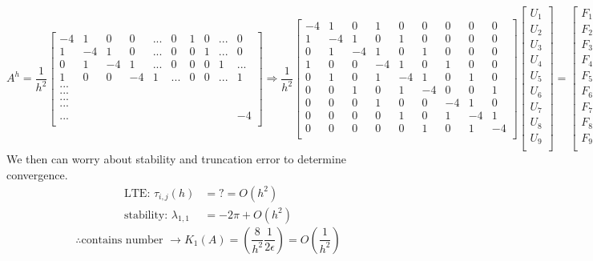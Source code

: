 \documentclass[10pt]{article}
\newcommand{\1}{\mathbb{1}}
\begin{document}
\[A^h = \frac{1}{h^2} \begin{bmatrix}
-4 & 1 & 0 & 0 & ... & 0 & 1 & 0 & ... & 0\\
1 & -4 & 1 & 0 & ... & 0 & 0 & 1 & ... & 0\\
0 & 1 & -4 & 1 & ... & 0 & 0 & 0 & 1 & ...\\
1 & 0 & 0 & -4 & 1 & ... & 0 & 0 & ... & 1\\
...\\
...\\
...\\
...\\
... & & & & & & & & & -4\\
\end{bmatrix}
\Rightarrow \frac{1}{h^2} \begin{bmatrix}
    -4 & 1 & 0 & 1 & 0 & 0 & 0 & 0 & 0\\
    1 & -4 & 1 & 0 & 1 & 0 & 0 & 0 & 0\\
    0 & 1 & -4 & 1 & 0 & 1 & 0 & 0 & 0\\
    1 & 0 &  0 & -4 & 1 & 0 & 1 & 0 & 0\\
    0 & 1 &  0 & 1 & -4 & 1 & 0 & 1 & 0\\
    0 & 0 &  1 & 0 & 1 & -4 & 0 & 0  & 1\\
    0 & 0 &  0 & 1 & 0 & 0 & -4 & 1  & 0\\
    0 & 0 &  0 & 0 & 1 & 0 & 1 & -4  & 1\\
    0 & 0 &  0 & 0 & 0 & 1 & 0 & 1  & -4\\
\end{bmatrix}
\begin{bmatrix}
    U_1\\
    U_2\\
    U_3\\
    U_4\\
    U_5\\
    U_6\\
    U_7\\
    U_8\\
    U_9\\
\end{bmatrix}
= \begin{bmatrix}
    F_1\\
    F_2\\
    F_3\\
    F_4\\
    F_5\\
    F_6\\
    F_7\\
    F_8\\
    F_9\\
\end{bmatrix}
\]
We then can worry about stability and truncation error to determine convergence.
\begin{align*}
    \text{LTE: } \tau_{i,j}(h) &= ? = O(h^2)\\
    \text{stability: } \lambda_{1,1} &= -2\pi + O(h^2)
\end{align*}
\[\therefore \text{contains number } \to K_1(A) = (\frac{8}{h^2} \frac{1}{2\epsilon}) = O\left(\frac{1}{h^2}\right)\]
\end{document}
